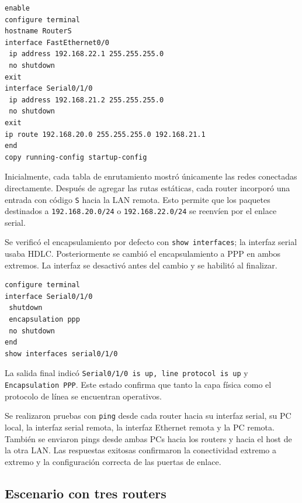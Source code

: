 \documentclass[a4paper,12pt]{article}
\newcommand{\ip}[1]{\texttt{#1}}
\begin{document}
\begin{lstlisting}
enable
configure terminal
hostname RouterS
interface FastEthernet0/0
 ip address 192.168.22.1 255.255.255.0
 no shutdown
exit
interface Serial0/1/0
 ip address 192.168.21.2 255.255.255.0
 no shutdown
exit
ip route 192.168.20.0 255.255.255.0 192.168.21.1
end
copy running-config startup-config
\end{lstlisting}

Inicialmente, cada tabla de enrutamiento mostró únicamente las redes conectadas directamente. Después de agregar las rutas estáticas, cada router incorporó una entrada con código \texttt{S} hacia la LAN remota. Esto permite que los paquetes destinados a \ip{192.168.20.0/24} o \ip{192.168.22.0/24} se reenvíen por el enlace serial.


Se verificó el encapsulamiento por defecto con \texttt{show interfaces}; la interfaz serial usaba HDLC. Posteriormente se cambió el encapsulamiento a PPP en ambos extremos. La interfaz se desactivó antes del cambio y se habilitó al finalizar.

\begin{lstlisting}
configure terminal
interface Serial0/1/0
 shutdown
 encapsulation ppp
 no shutdown
end
show interfaces serial0/1/0
\end{lstlisting}

La salida final indicó \texttt{Serial0/1/0 is up, line protocol is up} y \texttt{Encapsulation PPP}. Este estado confirma que tanto la capa física como el protocolo de línea se encuentran operativos.


Se realizaron pruebas con \texttt{ping} desde cada router hacia su interfaz serial, su PC local, la interfaz serial remota, la interfaz Ethernet remota y la PC remota. También se enviaron pings desde ambas PCs hacia los routers y hacia el host de la otra LAN. Las respuestas exitosas confirmaron la conectividad extremo a extremo y la configuración correcta de las puertas de enlace.


\subsection*{Escenario con tres routers}
\end{document}
